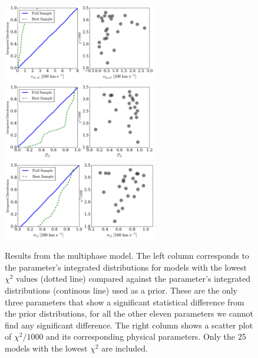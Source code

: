 \documentclass[a4,useAMS,usenatbib,usegraphicx]{mn2e}
\begin{document}
\begin{figure}
\begin{center}
  \includegraphics[width=0.6\textwidth]{vinf_cl.pdf}
  \includegraphics[width=0.6\textwidth]{P_cl.pdf}
  \includegraphics[width=0.6\textwidth]{sigma_cl.pdf}
\caption{Results from the multiphase
  model.
  The left column corresponds to the parameter's integrated distributions for
  models with the lowest $\chi^2$ values (dotted line) compared against the
  parameter's integrated distributions (continous line) used as a prior.
  These are the only three parameters that show a significant statistical difference from
  the prior distributions, for all the other eleven parameters we
  cannot find any significant difference.
  The right column shows a scatter plot of $\chi^2/1000$
  and its corresponding physical parameters.
  Only the  25 models with the lowest $\chi^2$ are included.
  \label{multiphaseresults}
}  
\end{center}
\end{figure}
\end{document}
